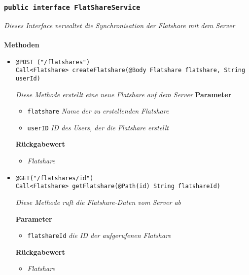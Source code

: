 	\subsubsection{\texttt{public interface FlatShareService }}
\textit{Dieses Interface verwaltet die Synchronisation der Flatshare mit dem Server}\\
\\
	\textbf{Methoden} 
		\begin{itemize}
		\item\texttt{{@POST ("/flatshares") \\
Call<Flatshare> createFlatshare(@Body Flatshare flatshare, String userId)
}}

		\textit{Diese Methode erstellt eine neue Flatshare auf dem Server
}
	\textbf{Parameter} 
			\begin{itemize}
				\item\texttt{flatshare}
		 		\textit{Name der zu erstellenden Flatshare}
		 		
		 		\item\texttt{userID}
		 		\textit{ID des Users, der die Flatshare erstellt}
	 		\end{itemize}

		\textbf{Rückgabewert} 
		\begin{itemize}
		\item\textit{Flatshare}
		\end{itemize}

      \item\texttt{{@GET("/flatshares/{id}")\\ Call<Flatshare> getFlatshare(@Path(\grqq id\grqq) 					String flatshareId)}}

		\textit{Diese Methode ruft die Flatshare-Daten vom Server ab}

		\textbf{Parameter} 
			\begin{itemize}
				\item\texttt{flatshareId}
		 		\textit{die ID der aufgerufenen Flatshare}
	 		\end{itemize}

		\textbf{Rückgabewert} 
		\begin{itemize}
		\item\textit{Flatshare}
		\end{itemize}

	 \end{itemize}



